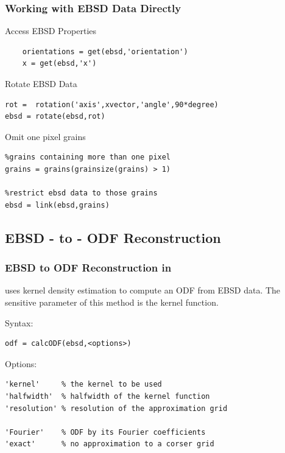 \begin{frame}[fragile]
  \frametitle{Working with EBSD Data Directly}

	Access EBSD Properties
\begin{lstlisting}
	orientations = get(ebsd,'orientation')
	x = get(ebsd,'x')
\end{lstlisting}

	\medskip

	Rotate EBSD Data
\begin{lstlisting}
rot =  rotation('axis',xvector,'angle',90*degree)
ebsd = rotate(ebsd,rot)
\end{lstlisting}

	\medskip
        Omit one pixel grains
\begin{lstlisting}
%grains containing more than one pixel
grains = grains(grainsize(grains) > 1)

%restrict ebsd data to those grains
ebsd = link(ebsd,grains)
\end{lstlisting}

\end{frame}

\subsection*{EBSD - to - ODF Reconstruction}


\begin{frame}[fragile]
  \frametitle{EBSD to ODF Reconstruction in \MTEX}

  \mtex uses kernel density estimation to compute an ODF from EBSD data. The
  sensitive parameter of this method is the kernel function.

\medskip

  Syntax:
  \begin{alertenv}
\begin{lstlisting}
odf = calcODF(ebsd,<options>)
\end{lstlisting}
  \end{alertenv}

Options:
\begin{lstlisting}
'kernel'     % the kernel to be used
'halfwidth'  % halfwidth of the kernel function
'resolution' % resolution of the approximation grid

'Fourier'    % ODF by its Fourier coefficients
'exact'      % no approximation to a corser grid
\end{lstlisting}


\end{frame}

